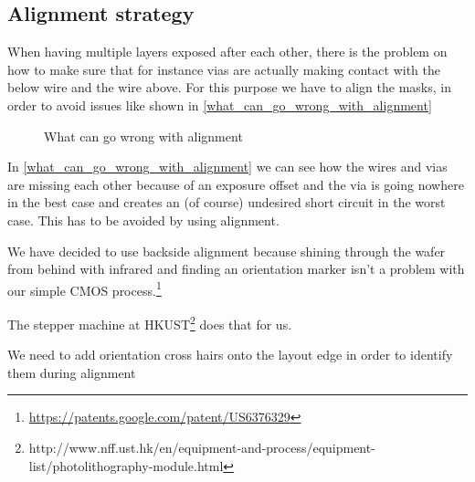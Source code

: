 \newcommand{\addAlignmentCross}[2]{
	\draw[line width=1.5mm, active,opacity=\OpacityLayout] (#1,#2+0.5) -- (#1+1,#2+0.5);
	\draw[line width=1.5mm, active,opacity=\OpacityLayout] (#1+0.5,#2) -- (#1+0.5,#2+1);
}

\subsection{Alignment strategy}
When having multiple layers exposed after each other, there is the problem on how to make sure that for instance vias are actually making contact with the below wire and the wire above.
For this purpose we have to align the masks, in order to avoid issues like shown in \autoref{what_can_go_wrong_with_alignment}

\begin{figure}[H]
	\centering
	\caption{What can go wrong with alignment}
	\label{what_can_go_wrong_with_alignment}
\end{figure}

In \autoref{what_can_go_wrong_with_alignment} we can see how the wires and vias are missing each other because of an exposure offset and the via is going nowhere in the best case and creates an (of course) undesired short circuit in the worst case. This has to be avoided by using alignment.

We have decided to use backside alignment because shining through the wafer from behind with infrared and finding an orientation marker isn't a problem with our simple CMOS process.\footnote{\url{https://patents.google.com/patent/US6376329}}

The stepper machine at HKUST\footnote{http://www.nff.ust.hk/en/equipment-and-process/equipment-list/photolithography-module.html} does that for us.

We need to add orientation cross hairs onto the layout edge in order to identify them during alignment

